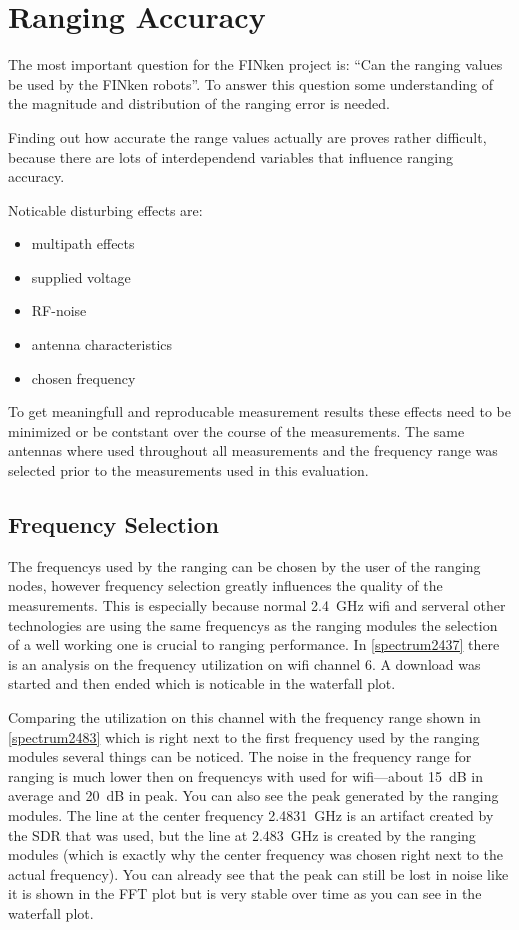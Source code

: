 \section{Ranging Accuracy}

The most important question for the FINken project is: \enquote{Can the ranging values be used by the FINken robots}.
To answer this question some understanding of the magnitude and distribution of the ranging error is needed.

Finding out how accurate the range values actually are proves rather difficult, because there are lots of interdependend variables that influence ranging accuracy.

Noticable disturbing effects are:
\begin{itemize}
	\item multipath effects
	\item supplied voltage
	\item RF-noise
	\item	antenna characteristics
	\item chosen frequency
\end{itemize}

To get meaningfull and reproducable measurement results these effects need to be minimized or be contstant over the course of the measurements.
The same antennas where used throughout all measurements and the frequency range was selected prior to the measurements used in this evaluation.

\subsection{Frequency Selection}
\label{freqencyselection}
The frequencys used by the ranging can be chosen by the user of the ranging nodes,
however frequency selection greatly influences the quality of the measurements.
This is especially because normal \SI{2.4}{\giga\hertz} wifi and serveral other technologies are using the same frequencys as the ranging modules the selection of a well working one is crucial to ranging performance.
In \autoref{spectrum2437} there is an analysis on the frequency utilization on wifi channel 6.
A download was started and then ended which is noticable in the waterfall plot.

Comparing the utilization on this channel with the frequency range shown in \autoref{spectrum2483} which is right next to the first frequency used by the ranging modules several things can be noticed.
The noise in the frequency range for ranging is much lower then on frequencys with used for wifi—about \SI{15}{dB} in average and \SI{20}{dB} in peak.
You can also see the peak generated by the ranging modules.
The line at the center frequency \SI{2.4831}{\giga\hertz} is an artifact created by the SDR that was used, but the line at \SI{2.483}{\giga\hertz} is created by the ranging modules (which is exactly why the center frequency was chosen right next to the actual frequency).
You can already see that the peak can still be lost in noise like it is shown in the FFT plot but is very stable over time as you can see in the waterfall plot.


